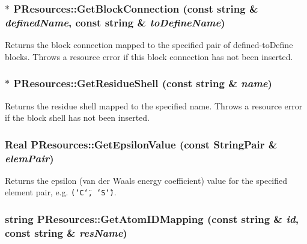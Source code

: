 \subsubsection{ $\ast$ PResources::Get\-Block\-Connection (const string \& {\em defined\-Name}, const string \& {\em to\-Define\-Name})\hspace{0.3cm}{\tt  [static]}}\label{classPResources_316300137cb0c21dfa2a32a94b786a31}


Returns the block connection mapped to the specified pair of defined-to\-Define blocks. Throws a resource error if this block connection has not been inserted. 
\subsubsection{ $\ast$ PResources::Get\-Residue\-Shell (const string \& {\em name})\hspace{0.3cm}{\tt  [static]}}\label{classPResources_b11b7da0750bd2f473b4eb38abfb7008}


Returns the residue shell mapped to the specified name. Throws a resource error if the block shell has not been inserted. 
\subsubsection{\setlength{\rightskip}{0pt plus 5cm}Real PResources::Get\-Epsilon\-Value (const {\bf String\-Pair} \& {\em elem\-Pair})\hspace{0.3cm}{\tt  [static]}}\label{classPResources_fc24c80fd63f71def7bc63899599044e}


Returns the epsilon (van der Waals energy coefficient) value for the specified element pair, e.g. {\tt (\char`\"{}C\char`\"{}, \char`\"{}S\char`\"{})}. 
\subsubsection{\setlength{\rightskip}{0pt plus 5cm}string PResources::Get\-Atom\-IDMapping (const string \& {\em id}, const string \& {\em res\-Name})\hspace{0.3cm}{\tt  [static]}}\label{classPResources_06145d33f1710f07546d75b3003def8b}


